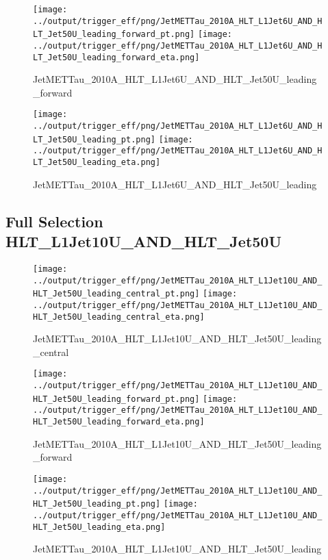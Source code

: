 \documentclass[11pt]{article}
\begin{document}
\begin{figure}[ht]
\centering
\texttt{[image: ../output/trigger\_eff/png/JetMETTau\_2010A\_HLT\_L1Jet6U\_AND\_HLT\_Jet50U\_leading\_forward\_pt.png]}
\texttt{[image: ../output/trigger\_eff/png/JetMETTau\_2010A\_HLT\_L1Jet6U\_AND\_HLT\_Jet50U\_leading\_forward\_eta.png]}
\caption{JetMETTau\_2010A\_HLT\_L1Jet6U\_AND\_HLT\_Jet50U\_leading\_forward}
\label{fig:jetmettau_L1Jet6U_AND_HLT_Jet50U_leading_forward}
\end{figure}

\begin{figure}[ht]
\centering
\texttt{[image: ../output/trigger\_eff/png/JetMETTau\_2010A\_HLT\_L1Jet6U\_AND\_HLT\_Jet50U\_leading\_pt.png]}
\texttt{[image: ../output/trigger\_eff/png/JetMETTau\_2010A\_HLT\_L1Jet6U\_AND\_HLT\_Jet50U\_leading\_eta.png]}
\caption{JetMETTau\_2010A\_HLT\_L1Jet6U\_AND\_HLT\_Jet50U\_leading}
\label{fig:jetmettau_L1Jet6U_AND_HLT_Jet50U_leading}
\end{figure}


\newpage
\subsection{Full Selection HLT\_L1Jet10U\_AND\_HLT\_Jet50U}
\begin{figure}[ht]
\centering
\texttt{[image: ../output/trigger\_eff/png/JetMETTau\_2010A\_HLT\_L1Jet10U\_AND\_HLT\_Jet50U\_leading\_central\_pt.png]}
\texttt{[image: ../output/trigger\_eff/png/JetMETTau\_2010A\_HLT\_L1Jet10U\_AND\_HLT\_Jet50U\_leading\_central\_eta.png]}
\caption{JetMETTau\_2010A\_HLT\_L1Jet10U\_AND\_HLT\_Jet50U\_leading\_central}
\label{fig:jetmettau_L1Jet10U_AND_HLT_Jet50U_leading_central}
\end{figure}

\begin{figure}[ht]
\centering
\texttt{[image: ../output/trigger\_eff/png/JetMETTau\_2010A\_HLT\_L1Jet10U\_AND\_HLT\_Jet50U\_leading\_forward\_pt.png]}
\texttt{[image: ../output/trigger\_eff/png/JetMETTau\_2010A\_HLT\_L1Jet10U\_AND\_HLT\_Jet50U\_leading\_forward\_eta.png]}
\caption{JetMETTau\_2010A\_HLT\_L1Jet10U\_AND\_HLT\_Jet50U\_leading\_forward}
\label{fig:jetmettau_L1Jet10U_AND_HLT_Jet50U_leading_forward}
\end{figure}

\begin{figure}[ht]
\centering
\texttt{[image: ../output/trigger\_eff/png/JetMETTau\_2010A\_HLT\_L1Jet10U\_AND\_HLT\_Jet50U\_leading\_pt.png]}
\texttt{[image: ../output/trigger\_eff/png/JetMETTau\_2010A\_HLT\_L1Jet10U\_AND\_HLT\_Jet50U\_leading\_eta.png]}
\caption{JetMETTau\_2010A\_HLT\_L1Jet10U\_AND\_HLT\_Jet50U\_leading}
\label{fig:jetmettau_L1Jet10U_AND_HLT_Jet50U_leading}
\end{figure}
\cleardoublepage
\end{document}
